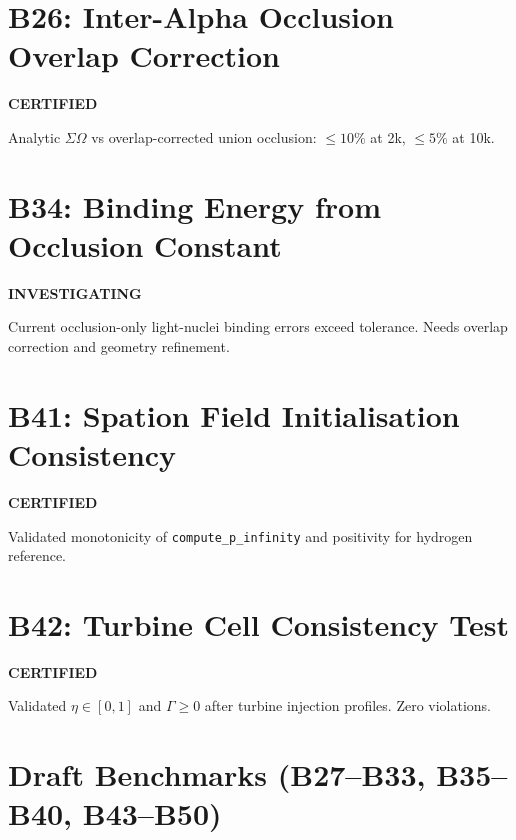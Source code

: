 \documentclass[12pt,a4paper]{report}
\newcommand{\PASS}{\textcolor{pass}{\textbf{CERTIFIED}}}
\newcommand{\INVEST}{\textcolor{invest}{\textbf{INVESTIGATING}}}
\begin{document}
\section{B26: Inter-Alpha Occlusion Overlap Correction}
\PASS

Analytic $\Sigma\Omega$ vs overlap-corrected union occlusion: $\leq 10\%$ at 2k, $\leq 5\%$ at 10k.

\section{B34: Binding Energy from Occlusion Constant}
\INVEST

Current occlusion-only light-nuclei binding errors exceed tolerance. Needs overlap correction and geometry refinement.

\section{B41: Spation Field Initialisation Consistency}
\PASS

Validated monotonicity of \texttt{compute\_p\_infinity} and positivity for hydrogen reference.

\section{B42: Turbine Cell Consistency Test}
\PASS

Validated $\eta \in [0,1]$ and $\Gamma \geq 0$ after turbine injection profiles. Zero violations.

\section{Draft Benchmarks (B27--B33, B35--B40, B43--B50)}
\end{document}

